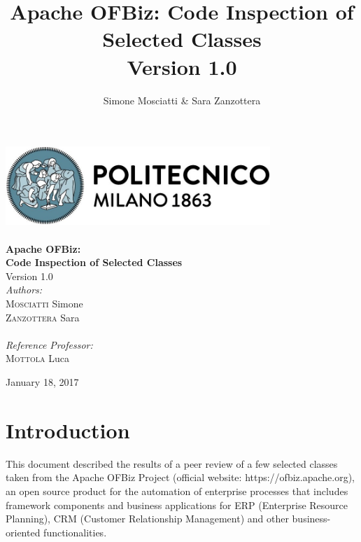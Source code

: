\documentclass[11pt]{article} %
\title{Apache OFBiz: Code Inspection of Selected Classes \\ {\Large Version 1.0}}
\author{Simone Mosciatti \& Sara Zanzottera}
\begin{document}
\begin{titlepage}

\newcommand{\HRule}{\rule{\linewidth}{0.5mm}} %
\center %

\includegraphics[width=10cm]{../DOC/polimiLogoNome.png}\\[0.5cm] %
 


\\[2cm]
{ \Huge \bfseries Apache OFBiz:} \\[0.5cm] %
{ \LARGE \bfseries Code Inspection of Selected Classes} \\[0.5cm]
{\large Version 1.0}
\\[2cm] 

\Large \emph{Authors:}\\
{\Large \textsc{Mosciatti}} Simone\\ %
{\Large \textsc{Zanzottera}} Sara\\
\\[1cm]
\emph{Reference Professor:} \\
{\Large \textsc{Mottola}} Luca %

\vfill %

{\large January 18, 2017}

\end{titlepage}


\newpage
\tableofcontents
\newpage

\section{Introduction}
This document described the results of a peer review of a few selected classes taken from the Apache OFBiz Project (official website: https://ofbiz.apache.org), an open source product for the automation of enterprise processes that includes framework components and business applications for ERP (Enterprise Resource Planning), CRM (Customer Relationship Management) and other business-oriented functionalities.
 
\end{document}
